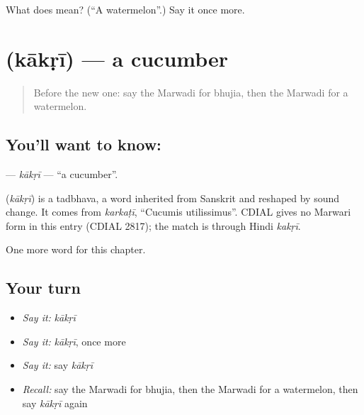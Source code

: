 \begin{tcolorbox}[breakable,colback=teal!4,colframe=teal!35!black,title={Before you move on}]
What does  mean? (\textquotedblleft{}A watermelon\textquotedblright{}.) Say it once more.
\end{tcolorbox}
\section[\texorpdfstring{\mw{काकड़ी} (kākṛī)}{काकड़ी (kākṛī)}]{ (kākṛī) — a cucumber}

\label{lesson:MW-C135-kakri}



\begin{quote}
Before the new one: say the Marwadi for bhujia, then the Marwadi for a watermelon.
\end{quote}

\subsection*{You'll want to know: }
\textbf{} — \emph{kākṛī} — \textquotedblleft{}a cucumber\textquotedblright{}.

\begin{cousinweb}
\textbf{} (\emph{kākṛī}) is a tadbhava, a word inherited from Sanskrit and reshaped by sound change. It comes from \emph{karkaṭī}, \textquotedblleft{}Cucumis utilissimus\textquotedblright{}. CDIAL gives no Marwari form in this entry (CDIAL 2817); the match is through Hindi \emph{kakṛī}.
\end{cousinweb}

\begin{grammarlens}[title={What you've built}]
One more word for this chapter.
\end{grammarlens}

\subsection*{Your turn}
\begin{itemize}
\raggedright
  \item \emph{Say it:} \emph{kākṛī}
  \item \emph{Say it:} \emph{kākṛī}, once more
  \item \emph{Say it:} say \emph{kākṛī}
  \item \emph{Recall:} say the Marwadi for bhujia, then the Marwadi for a watermelon, then say \emph{kākṛī} again
\end{itemize}

